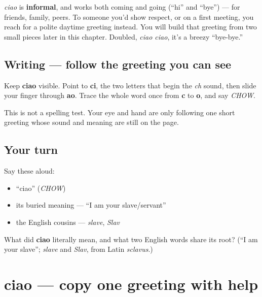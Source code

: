 \begin{culture}
\emph{ciao} is \textbf{informal}, and works both coming and going (\textquotedblleft{}hi\textquotedblright{} and \textquotedblleft{}bye\textquotedblright{}) — for friends, family, peers. To someone you'd show respect, or on a first meeting, you reach for a polite daytime greeting instead. You will build that greeting from two small pieces later in this chapter. Doubled, \emph{ciao ciao}, it's a breezy \textquotedblleft{}bye-bye.\textquotedblright{}
\end{culture}

\subsection*{Writing — follow the greeting you can see}
Keep \textbf{ciao} visible. Point to \textbf{ci}, the two letters that begin the \emph{ch} sound, then slide your finger through \textbf{ao}. Trace the whole word once from \textbf{c} to \textbf{o}, and say \emph{CHOW}.

This is not a spelling test. Your eye and hand are only following one short greeting whose sound and meaning are still on the page.

\subsection*{Your turn}
Say these aloud:

\begin{itemize}
\raggedright
  \item \textquotedblleft{}ciao\textquotedblright{} (\emph{CHOW})
  \item its buried meaning — \textquotedblleft{}I am your slave/servant\textquotedblright{}
  \item the English cousins — \emph{slave}, \emph{Slav}
\end{itemize}

\begin{tcolorbox}[breakable,colback=teal!4,colframe=teal!35!black,title={Before you move on}]
What did \textbf{ciao} literally mean, and what two English words share its root? (\textquotedblleft{}I am your slave\textquotedblright{}; \emph{slave} and \emph{Slav}, from Latin \emph{sclavus}.)
\end{tcolorbox}
\section[ciao]{ciao — copy one greeting with help}

